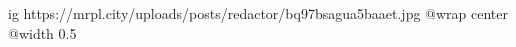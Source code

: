  
 
 
 
 

\ifcmt
  ig https://mrpl.city/uploads/posts/redactor/bq97bsagua5baaet.jpg
  @wrap center
  @width 0.5
\fi
